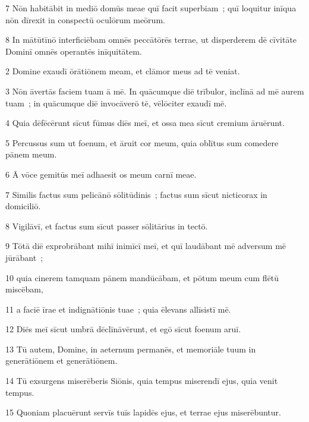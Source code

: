 \psalmVerse
  {\phantom{00}7}
  {Nōn habitābit in mediō domūs meae quī facit superbiam~; quī loquitur inīqua nōn dīrexit in conspectū oculōrum meōrum.}


\psalmVerse
  {\phantom{00}8}
  {In mātūtīnō interficiēbam omnēs peccātōrēs terrae, ut disperderem dē cīvitāte Dominī omnēs operantēs inīquitātem.}




\psalmVerse
  {\phantom{00}2}
  {Domine exaudī ōrātiōnem meam, et clāmor meus ad tē veniat.}


\psalmVerse
  {\phantom{00}3}
  {Nōn āvertās faciem tuam ā mē. In quācumque diē trībulor, inclīnā ad mē aurem tuam~; in quācumque diē invocāverō tē, vēlōciter exaudī mē.}


\psalmVerse
  {\phantom{00}4}
  {Quia dēfēcērunt sīcut fūmus diēs meī, et ossa mea sīcut cremium āruērunt.}


\psalmVerse
  {\phantom{00}5}
  {Percussus sum ut foenum, et āruit cor meum, quia oblītus sum comedere pānem meum.}


\psalmVerse
  {\phantom{00}6}
  {Ā vōce gemitūs meī adhaesit os meum carnī meae.}


\psalmVerse
  {\phantom{00}7}
  {Similis factus sum pelicānō sōlitūdinis~; factus sum sīcut nicticorax in domiciliō.}


\psalmVerse
  {\phantom{00}8}
  {Vigilāvī, et factus sum sīcut passer sōlitārius in tectō.}


\psalmVerse
  {\phantom{00}9}
  {Tōtā diē exprobrābant mihī inimīcī meī, et quī laudābant mē adversum mē jūrābant~;}


\psalmVerse
  {\phantom{0}10}
  {quia cinerem tamquam pānem mandūcābam, et pōtum meum cum flētū miscēbam,}


\psalmVerse
  {\phantom{0}11}
  {a faciē īrae et indignātiōnis tuae~; quia ēlevans allīsistī mē.}


\psalmVerse
  {\phantom{0}12}
  {Diēs meī sīcut umbrā dēclīnāvērunt, et egō sīcut foenum aruī.}


\psalmVerse
  {\phantom{0}13}
  {Tū autem, Domine, in aeternum permanēs, et memoriāle tuum in generātiōnem et generātiōnem.}


\psalmVerse
  {\phantom{0}14}
  {Tū exsurgens miserēberis Siōnis, quia tempus miserendī ejus, quia venit tempus.}


\psalmVerse
  {\phantom{0}15}
  {Quoniam placuērunt servīs tuīs lapidēs ejus, et terrae ejus miserēbuntur.}


